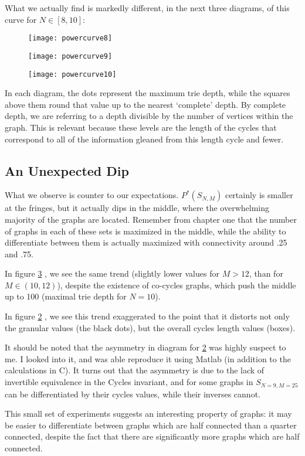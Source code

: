 What we actually find is markedly different, in the next three diagrams, of this curve for $N \in [8, 10]$:

\begin{figure}[h]
\caption{}
\centering
\texttt{[image: powercurve8]}
\label{fig:powercurve8}
\end{figure}

\begin{figure}[h]
\caption{}
\centering
\texttt{[image: powercurve9]}
\label{fig:powercurve9}
\end{figure}

\begin{figure}[h]
\caption{}
\centering
\texttt{[image: powercurve10]}
\label{fig:powercurve10}
\end{figure}

In each diagram, the dots represent the maximum trie depth, while the squares above them round that value up to the nearest `complete' depth.
By complete depth, we are referring to a depth divisible by the number of vertices within the graph.
This is relevant because these levels are the length of the cycles that correspond to all of the information gleaned from this length cycle and fewer.

\subsection{An Unexpected Dip}

What we observe is counter to our expectations.
$P^*(S_{N, M})$ certainly is smaller at the fringes, but it actually dips in the middle, where the overwhelming majority of the graphs are located.
Remember from chapter one that the number of graphs in each of these sets is maximized in the middle, while the ability to differentiate between them is actually maximized with connectivity around .25 and .75.

In figure \ref{fig:powercurve10} , we see the same trend (slightly lower values for $M > 12$, than for $M \in (10, 12)$), despite the existence of co-cycles graphs, which push the middle up to 100 (maximal trie depth for $N=10$).

In figure \ref{fig:powercurve9} , we see this trend exaggerated to the point that it distorts not only the granular values (the black dots), but the overall cycles length values (boxes).

It should be noted that the asymmetry in diagram for \ref{fig:powercurve9} was highly suspect to me.
I looked into it, and was able reproduce it using Matlab (in addition to the calculations in C).  
It turns out that the asymmetry is due to the lack of invertible equivalence in the Cycles invariant, and for some graphs in $S_{N=9, M=25}$ can be differentiated by their cycles values, while their inverses cannot.

This small set of experiments suggests an interesting property of graphs: it may be easier to differentiate between graphs which are half connected than a quarter connected, despite the fact that there are significantly more graphs which are half connected.
